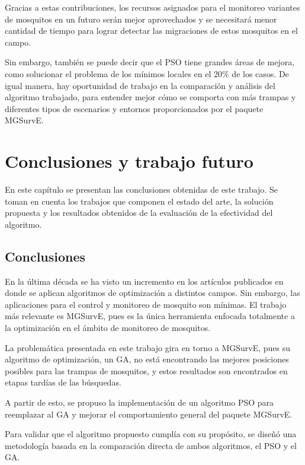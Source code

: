 \documentclass[letterpaper]{report}
\begin{document}
  Gracias a estas contribuciones, los recursos asignados para el monitoreo 
  variantes de mosquitos en un futuro serán mejor aprovechados y se necesitará
  menor cantidad de tiempo para lograr detectar las migraciones de estos
  mosquitos en el campo.

  Sin embargo, también se puede decir que
  el PSO tiene grandes áreas de mejora, como solucionar el problema de los
  mínimos locales en el 20\% de los casos. De igual manera, hay oportunidad de
  trabajo en la comparación y análisis del algoritmo trabajado, para entender
  mejor cómo se comporta con más trampas y diferentes tipos de escenarios y
  entornos proporcionados por el paquete MGSurvE.

\chapter{Conclusiones y trabajo futuro}\label{chap:conclusiones}

    En este capítulo se presentan las conclusiones obtenidas de este trabajo. 
    Se toman en cuenta los trabajos que componen el estado del arte, la solución
    propuesta y los resultados obtenidos de la evaluación de la efectividad del
    algoritmo.

    \section{Conclusiones}

    En la última década se ha visto un incremento en los artículos publicados
    en donde se aplican algoritmos de optimización a distintos campos. Sin
    embargo, las aplicaciones para el control y monitoreo de mosquito son
    mínimas. El trabajo más relevante es MGSurvE, pues es la única herramienta
    enfocada totalmente a la optimización en el ámbito de monitoreo de
    mosquitos.

    La problemática presentada en este trabajo gira en torno a MGSurvE, pues su
    algoritmo de optimización, un GA, no está encontrando las mejores posiciones
    posibles para las trampas de mosquitos, y estos resultados son encontrados
    en etapas tardías de las búsquedas. 

    A partir de esto, se propuso la implementación de un algoritmo PSO para
    reemplazar al GA y mejorar el comportamiento general del paquete MGSurvE.

    Para validar que el algoritmo propuesto cumplía con su propósito, se diseñó
    una metodología basada en la comparación directa de ambos algoritmos, el PSO
    y el GA.
    
\end{document}
